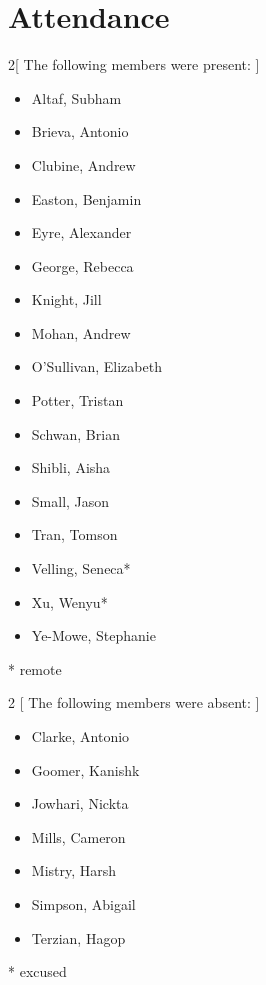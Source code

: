 \documentclass[12pt, letterpaper]{article}
\begin{document}
\hypersetup{} %

\header{} %

\section*{Attendance}

\begin{multicols}{2}[
        The following members were present:
    ]

\begin{itemize}
    \item Altaf, Subham
    \item Brieva, Antonio
    \item Clubine, Andrew
    \item Easton, Benjamin
    \item Eyre, Alexander
    \item George, Rebecca
    \item Knight, Jill
    \item Mohan, Andrew
    \item O'Sullivan, Elizabeth
    \item Potter, Tristan
    \item Schwan, Brian
    \item Shibli, Aisha
    \item Small, Jason
    \item Tran, Tomson
    \item Velling, Seneca*
    \item Xu, Wenyu*
    \item Ye-Mowe, Stephanie
\end{itemize}

\end{multicols}
* remote \\

\begin{multicols}{2}
    [
        The following members were absent:
    ]
\begin{itemize}
    \item Clarke, Antonio
    \item Goomer, Kanishk
    \item Jowhari, Nickta 
    \item Mills, Cameron
    \item Mistry, Harsh
    \item Simpson, Abigail
    \item Terzian, Hagop
\end{itemize}
\end{multicols}
* excused\\
\end{document}
